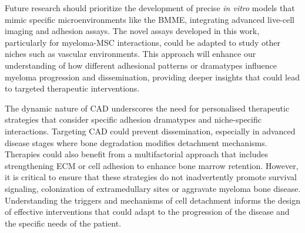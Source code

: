 Future research should prioritize the development of precise \textit{in vitro}
models that mimic specific microenvironments like the \ac{BMME}, integrating
advanced live-cell imaging and adhesion assays. The novel assays developed in
this work, particularly for myeloma-MSC interactions, could be adapted to study
other niches such as vascular environments. This approach will enhance our
understanding of how different adhesional patterns or dramatypes influence
myeloma progression and dissemination, providing deeper insights that could lead
to targeted therapeutic interventions.

The dynamic nature of \ac{CAD} underscores the need for personalised therapeutic
strategies that consider specific adhesion dramatypes and niche-specific
interactions. Targeting \ac{CAD} could prevent dissemination, especially in
advanced disease stages where bone degradation modifies detachment mechanisms.
Therapies could also benefit from a multifactorial approach that includes
strengthening \ac{ECM} or cell adhesion to enhance bone marrow retention.
However, it is critical to ensure that these strategies do not inadvertently
promote survival signaling, colonization of extramedullary sites or aggravate
myeloma bone disease. Understanding the triggers and mechanisms of cell
detachment informs the design of effective interventions that could adapt to the
progression of the disease and the specific needs of the patient.
